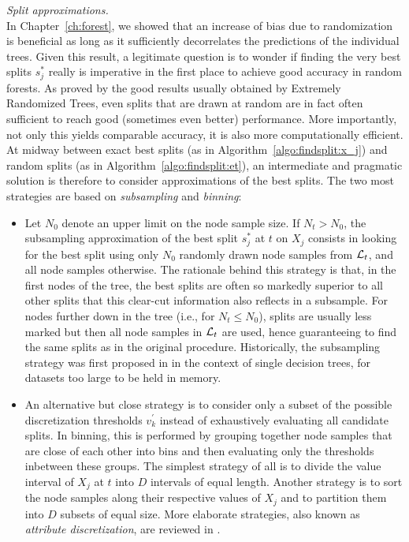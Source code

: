 \begin{description}
\item \textit{Split approximations.}\hfill\\
    In Chapter~\ref{ch:forest}, we showed that an increase of bias due to
    randomization is beneficial as long as it sufficiently decorrelates the
    predictions of the individual trees. Given this result, a legitimate
    question is to wonder if finding the very best splits $s^*_j$ really is
    imperative in the first place to achieve good accuracy in random forests. As proved by the
    good results usually obtained by Extremely Randomized Trees, even splits
    that are drawn at random are in fact often sufficient to reach good
    (sometimes even better) performance. More importantly, not only this yields
    comparable accuracy, it is also more computationally efficient. At midway
    between  exact best splits (as in Algorithm~\ref{algo:findsplit:x_j}) and
    random splits (as in Algorithm~\ref{algo:findsplit:et}), an intermediate
    and pragmatic solution is therefore to consider approximations of the best splits.
    The two most strategies are based on \textit{subsampling} and \textit{binning}:

    \begin{itemize}
    \item Let $N_0$ denote an upper limit on the node sample size. If $N_t > N_0$,
          the subsampling approximation of the best split $s^*_j$ at $t$ on $X_j$ consists
          in looking for the best split using only $N_0$ randomly drawn node
          samples from ${\cal L}_t$, and all node samples otherwise. The rationale behind this strategy is
          that, in the first nodes of the tree, the best splits are often
          so markedly superior to all other splits that this clear-cut information
          also reflects in a subsample. For nodes further down in the tree (i.e., for $N_t \leq N_0$),
          splits are usually less marked but then all node samples in ${\cal L}_t$
          are used, hence guaranteeing to find the same splits as in the original procedure.
          Historically, the subsampling strategy was first proposed in \citep{breiman:1984}
          in the context of single decision trees, for datasets too large to be held in memory.

    \item An alternative but close strategy is to consider only a subset
          of the possible discretization thresholds $v^\prime_k$ instead
          of exhaustively evaluating all candidate splits. In binning, this
          is performed by grouping together node samples that are close
          of each other into bins and then evaluating only the thresholds inbetween these groups.
          The simplest strategy of all is to divide the value interval of $X_j$
          at $t$ into $D$ intervals of equal length. Another strategy
          is to sort the node samples along their respective values of $X_j$
          and to partition them into $D$ subsets of equal size.
          More elaborate strategies, also known as \textit{attribute discretization},
          are reviewed in \citep{zighed:2000}.


\end{itemize}
\end{description}
